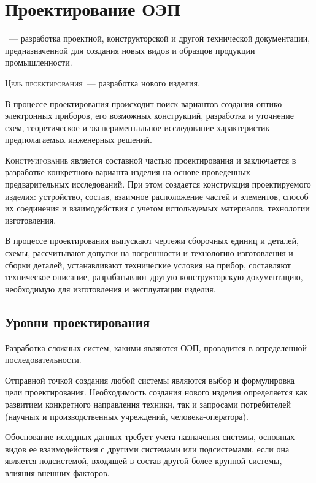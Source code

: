 
\chapter{Проектирование ОЭП}
~--- разработка проектной, конструкторской и другой технической документации, предназначенной для создания новых видов и образцов продукции промышленности.

\noindent
\textsc{Цель проектирования}~--- разработка нового изделия.

В процессе проектирования происходит поиск вариантов создания оптико-электронных приборов, его возможных конструкций, разработка и уточнение схем, теоретическое и экспериментальное исследование характеристик предполагаемых инженерных решений.

\noindent
\textsc{Конструирование} является составной частью проектирования и заключается в разработке конкретного варианта изделия на основе проведенных предварительных исследований. При этом создается конструкция проектируемого изделия: устройство, состав, взаимное расположение частей и элементов, способ их соединения и взаимодействия с учетом используемых материалов, технологии изготовления.

В процессе проектирования выпускают чертежи сборочных единиц и деталей, схемы, рассчитывают допуски на погрешности и технологию изготовления и сборки деталей, устанавливают технические условия на прибор, составляют техническое описание, разрабатывают другую конструкторскую документацию, необходимую для изготовления и эксплуатации изделия.

\section{Уровни проектирования}
Разработка сложных систем, какими являются ОЭП, проводится в определенной последовательности.

Отправной точкой создания любой системы являются выбор и формулировка цели проектирования. Необходимость создания нового изделия определяется как развитием конкретного направления техники, так и запросами потребителей (научных и производственных учреждений, человека-оператора). 

Обоснование исходных данных требует учета назначения системы, основных видов ее взаимодействия с другими системами или подсистемами, если она является подсистемой, входящей в состав другой более крупной системы, влияния внешних факторов.

